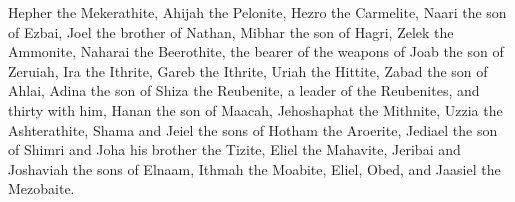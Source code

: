 \begin{biblechapter}
\verse Hepher the Mekerathite, Ahijah the Pelonite,
\verse Hezro the Carmelite, Naari the son of Ezbai,
\verse Joel the brother of Nathan, Mibhar the son of Hagri,
\verse Zelek the Ammonite, Naharai the Beerothite, the bearer of the weapons of Joab the son of Zeruiah,
\verse Ira the Ithrite, Gareb the Ithrite,
\verse Uriah the Hittite, Zabad the son of Ahlai,
\verse Adina the son of Shiza the Reubenite, a leader of the Reubenites, and thirty with him,
\verse Hanan the son of Maacah, Jehoshaphat the Mithnite,
\verse Uzzia the Ashterathite, Shama and Jeiel the sons of Hotham the Aroerite,
\verse Jediael the son of Shimri and Joha his brother the Tizite,
\verse Eliel the Mahavite, Jeribai and Joshaviah the sons of Elnaam, Ithmah the Moabite,
\verse Eliel, Obed, and Jaasiel the Mezobaite.
\end{biblechapter}

